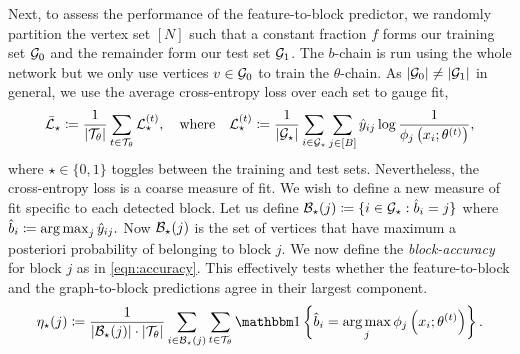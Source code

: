 Next, to assess the performance of the feature-to-block predictor, 
we randomly partition the vertex set $[N]$ such that a constant fraction $f$ forms our training set $\mathcal{G}_0$ and the remainder form our test set $\mathcal{G}_1$.
The $b$-chain is run using the whole network but we only use vertices $v \in \mathcal{G}_0$ to train the $\theta$-chain. As $|\mathcal{G}_0| \neq |\mathcal{G}_1|$ in general, we use the average cross-entropy loss 
over each set to gauge fit,
%
\begin{equation}
	\bar{\mathcal{L}}_\star \coloneqq \frac{1}{|\mathcal{T}_\theta|} \sum_{t \in \mathcal{T}_\theta} \mathcal{L}_\star^{(t)},
	\quad \textrm{where} \quad
	\mathcal{L}_\star^{(t)} \coloneqq \frac{1}{|\mathcal{G}_\star|} \sum_{i \in \mathcal{G}_\star}\sum_{j \in [B]} \hat{y}_{ij} \log \frac{1}{\phi_j \left(x_i; \theta^{(t)} \right)},
	\label{eqn:cross-entropy-loss}
\end{equation}
%
where $\star \in \{0, 1\}$ toggles between the training and test sets.
%
Nevertheless, the cross-entropy loss is a coarse measure of fit. We wish to define a new measure of fit specific to each detected block. Let us define
$
	\mathcal{B}_\star(j) \coloneqq \{i \in \mathcal{G}_\star : \hat{b}_i = j\}
$
where
$ 
	\hat{b}_i \coloneqq \operatorname*{arg\,max}_j \hat{y}_{ij}.
$
Now $\mathcal{B}_\star(j)$ is the set of vertices that have maximum a posteriori probability of belonging to block $j$. We now define the {\em block-accuracy} for block $j$ as in \ref{eqn:accuracy}. This effectively tests whether the feature-to-block and the graph-to-block predictions agree in their largest component.
%
\begin{equation}
	\eta_\star(j) \coloneqq \frac{1}{|\Bcal_\star (j)| \cdot 
	|\Tcal_\theta| } 
	\sum_{i \in \Bcal_\star (j)}  \sum_{t \in \Tcal_\theta}
	\one \left\{\hat{b}_i = \argmax_j \phi_j \left( x_i; \theta^{(t)} \right) \right\}.
	\label{eqn:accuracy}
\end{equation}




